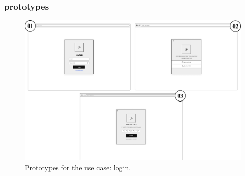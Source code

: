 \documentclass[]{uc2pfecaneva}
\begin{document}
    \subsubsection{prototypes}
    \begin{figure}[h]

        \centering
        \includegraphics[width=\textwidth]{images/login}

        \caption{Prototypes for the use case: login.}
    \end{figure}
    \clearpage
\end{document}
